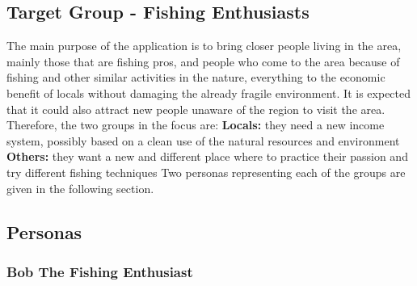 \subsection{Target Group - Fishing Enthusiasts}
The main purpose of the application is to bring closer people living in the area, mainly those that are fishing pros, and people who come to the area because of fishing and other similar activities in the nature, everything to the economic benefit of locals without damaging the already fragile environment. It is expected that it could also attract new people unaware of the region to visit the area. Therefore, the two groups in the focus are:  
\newline
\textbf{Locals:} they need a new income system, possibly based on a clean use of the natural resources and environment 
\newline
\textbf{Others:} they want a new and different place where to practice their passion and try different fishing techniques 
\newline 
\newline
Two personas representing each of the groups are given in the following section.

\subsection{Personas}
\subsubsection*{Bob The Fishing Enthusiast}

